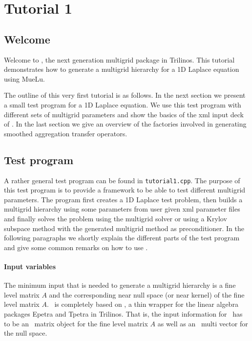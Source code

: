 \section{Tutorial 1}
\subsection{Welcome}
Welcome to \MueLu, the next generation multigrid package in Trilinos. This tutorial demonstrates how to generate a multigrid hierarchy for a 1D Laplace equation using MueLu.

The outline of this very first tutorial is as follows. In the next section we present a small test program for a 1D Laplace equation. We use this test program with different sets of multigrid parameters and show the basics of the xml input deck of \MueLu. In the last section we give an overview of the factories involved in generating smoothed aggregation transfer operators.

\subsection{Test program}
A rather general test program can be found in \texttt{tutorial1.cpp}. The purpose of this test program is to provide a framework to be able to test different multigrid parameters. The program first creates a 1D Laplace test problem, then builds a multigrid hierarchy using some parameters from user given xml parameter files and finally solves the problem using the multigrid solver or using a Krylov subspace method with the generated multigrid method as preconditioner. In the following paragraphs we shortly explain the different parts of the test program and give some common remarks on how to use \MueLu.

\paragraph{Input variables}
The minimum input that is needed to generate a multigrid hierarchy is a fine level matrix $A$ and the corresponding near null space (or near kernel) of the fine level matrix $A$. \MueLu~is completely based on \Xpetra, a thin wrapper for the linear algebra packages Epetra and Tpetra in Trilinos. That is, the input information for \MueLu~has to be an \Xpetra~matrix object for the fine level matrix $A$ as well as an \Xpetra~multi vector for the null space.


